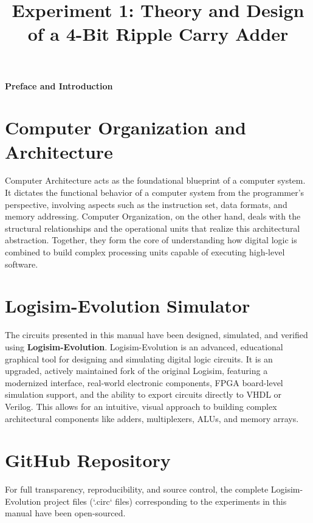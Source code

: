 \documentclass[11pt, a4paper]{article}
\title{\vspace{-2em}\sffamily\textbf{\Huge Experiment 1: Theory and Design \\ \vspace{0.2em} \Large of a 4-Bit Ripple Carry Adder}}
\author{}
\date{}
\begin{document}
\newpage

\begin{center}
    \sffamily\textbf{\Huge Preface and Introduction}
\end{center}
\vspace{2em}

\section*{Computer Organization and Architecture}
Computer Architecture acts as the foundational blueprint of a computer system. It dictates the functional behavior of a computer system from the programmer's perspective, involving aspects such as the instruction set, data formats, and memory addressing. Computer Organization, on the other hand, deals with the structural relationships and the operational units that realize this architectural abstraction. Together, they form the core of understanding how digital logic is combined to build complex processing units capable of executing high-level software.

\vspace{1.5em}

\section*{Logisim-Evolution Simulator}
The circuits presented in this manual have been designed, simulated, and verified using \textbf{Logisim-Evolution}. Logisim-Evolution is an advanced, educational graphical tool for designing and simulating digital logic circuits. It is an upgraded, actively maintained fork of the original Logisim, featuring a modernized interface, real-world electronic components, FPGA board-level simulation support, and the ability to export circuits directly to VHDL or Verilog. This allows for an intuitive, visual approach to building complex architectural components like adders, multiplexers, ALUs, and memory arrays.

\vspace{1.5em}

\section*{GitHub Repository}

For full transparency, reproducibility, and source control, the complete Logisim-Evolution project files (`.circ` files) corresponding to the experiments in this manual have been open-sourced. 
\end{document}
